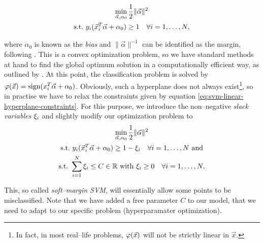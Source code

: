 \begin{gather}
\label{eq:svm-linear-hyperplane}
\min_{\vec \alpha, \alpha_0} \frac{1}{2} \| \vec \alpha \|^2 \\
\label{eq:svm-linear-hyperplane-constraints}
\text{\st} y_i (\vec x_i^T \vec \alpha + \alpha_0) \ge 1 \quad \forall i = 1, \ldots, N,
\end{gather}

where $\alpha_0$ is known as the \emph{bias} and $\|\vec \alpha \|^{-1}$ can be identified as the margin, following \citet{hastie2001}. This is a convex optimization problem, so we have standard methods at hand to find the global optimum solution in a computationally efficient way, as outlined by \citet{vanderplas2015}. At this point, the classification problem is solved by $\varphi(\vec x) = \operatorname{sign}(x_i^T \vec \alpha + \alpha_0)$. Obviously, such a hyperplane does not always exist\footnote{In fact, in most real--life problems, $\varphi(\vec x)$ will not be strictly linear in $\vec x$.}, so in practise we have to relax the constraints given by equation \eqref{eq:svm-linear-hyperplane-constraints}. For this purpose, we introduce the non--negative \emph{slack variables} $\xi_i$ and slightly modify our optimization problem to \\

\begin{gather}
\label{eq:svm-linear-hyperplane-relaxed}
\min_{\vec \alpha, \alpha_0} \frac{1}{2} \| \vec \alpha \|^2 \\
\text{\st} y_i (\vec x_i^T \vec \alpha + \alpha_0) \ge 1 - \slack_i \quad \forall i = 1, \ldots, N \text{\ and} \\
\text{\st} \sum\limits_{i=1}^{N} \slack_i \le C \in \mathbb{R} \text{\ with\ } \slack_i \ge 0 \quad \forall i = 1, \ldots, N.
\end{gather}

This, so called \emph{soft--margin SVM}, will essentially allow some points to be misclassified. Note that we have added a free parameter $C$ to our model, that we need to adapt to our specific problem (hyperparamater optimization).\\


